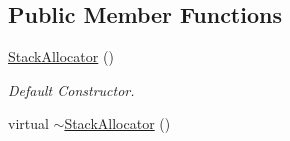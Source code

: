\subsection*{Public Member Functions}
\begin{DoxyCompactItemize}
\item 
\hyperlink{classDE_1_1StackAllocator_a71869927ff38ef330d4146bc1c2608c7}{Stack\+Allocator} ()\hypertarget{classDE_1_1StackAllocator_a71869927ff38ef330d4146bc1c2608c7}{}\label{classDE_1_1StackAllocator_a71869927ff38ef330d4146bc1c2608c7}

\begin{DoxyCompactList}\small\item\em Default Constructor. \end{DoxyCompactList}\item 
virtual \hyperlink{classDE_1_1StackAllocator_a6e680f39f10b1f07ae7d3bd485138abc}{$\sim$\+Stack\+Allocator} ()\hypertarget{classDE_1_1StackAllocator_a6e680f39f10b1f07ae7d3bd485138abc}{}\label{classDE_1_1StackAllocator_a6e680f39f10b1f07ae7d3bd485138abc}


\end{DoxyCompactItemize}
